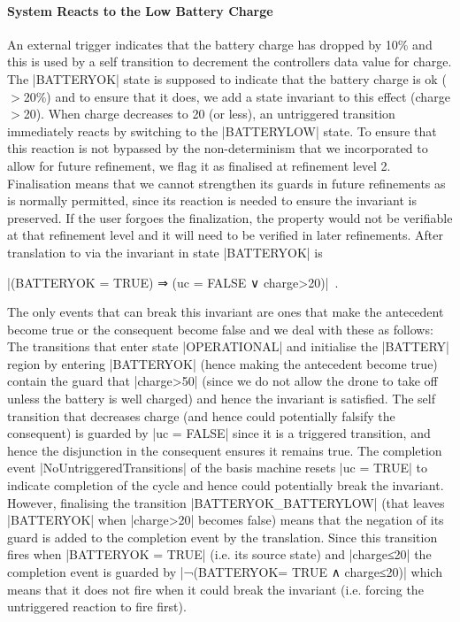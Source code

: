 \paragraph{System Reacts to the Low Battery Charge}
An external trigger indicates that the battery charge has dropped by 10\% and this is used by a self transition to decrement the controllers data value for charge.
The |BATTERYOK| state is supposed to indicate that the battery charge is ok ($>$20\%) and to ensure that it does, we add a state invariant to this effect (charge$>$20).
When charge decreases to 20 (or less), an untriggered transition immediately reacts by switching to the |BATTERYLOW| state.
To ensure that this reaction is not bypassed by the non-determinism that we incorporated to allow for future refinement, we flag it as finalised at refinement level 2.
Finalisation means that we cannot strengthen its guards in future refinements as is normally permitted, since its reaction is needed to ensure the invariant is preserved. If the user forgoes the finalization, the property would not be verifiable at that refinement level and it will need to be verified in later refinements.
After translation to 
\EVENTB via \UMLB
the invariant in state |BATTERYOK| is 
\begin{center}
 |(BATTERYOK = TRUE) ⇒ (uc = FALSE ∨ charge>20)|~.
\end{center}
The only events that can break this invariant are ones that make the antecedent become true or the consequent become false and we deal with these as follows:
The transitions that enter state |OPERATIONAL| and initialise the |BATTERY| region by entering |BATTERYOK| (hence making the antecedent become true) contain the guard that |charge>50| (since we do not allow the drone to take off unless the battery is well charged) and hence the invariant is satisfied.
The self transition that decreases charge (and hence could potentially falsify the consequent) is guarded by |uc = FALSE| since it is a triggered transition, and hence the disjunction in the consequent ensures it remains true.
The completion event |NoUntriggeredTransitions| of the basis machine resets |uc = TRUE| to indicate completion of the cycle and hence could potentially break the invariant. 
However, finalising the transition |BATTERYOK_BATTERYLOW| (that leaves |BATTERYOK| when |charge>20| becomes false) means that  the negation of its guard is added to the completion event by the translation.
Since this transition fires when |BATTERYOK = TRUE| (i.e. its source state) and |charge≤20| the completion event is guarded by |¬(BATTERYOK= TRUE ∧ charge≤20)| which means that it does not fire when it could break the invariant (i.e. forcing the untriggered reaction to fire first).

